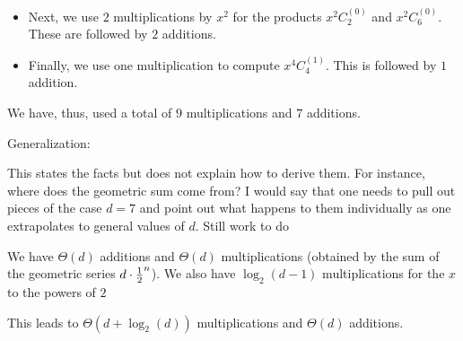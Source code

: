 \begin{itemize}
\begin{enumerate}
\begin{itemize}
\medskip\item
Next, we use $2$ multiplications by $x^2$ for the products $x^2  C_2^{(0)}$ and $x^2  C_6^{(0)}$.  These are followed by $2$ additions.

\medskip\item
Finally, we use one multiplication to compute $x^4 C_4^{(1)}$.  This is followed by $1$ addition.
\end{itemize}
We have, thus, used a total of $9$ multiplications and $7$ additions.

\medskip

Generalization: 

{\Arny This states the facts but does not explain how to derive them.  For instance, where does the geometric sum come from?  I would say that one needs to pull out pieces of the case $d=7$ and point out what happens to them individually as one extrapolates to general values of $d$.    Still work to do}

We have $\Theta(d)$ additions and $\Theta(d)$ multiplications (obtained by the sum of the geometric series $d \cdot {{1} \over {2}}^n$). 
We also have $\log_2(d-1)$ multiplications for the $x$ to the powers of $2$

This leads to $\Theta(d + \log_2(d))$ multiplications and $\Theta(d)$ additions.
\end{enumerate}

\end{itemize}


